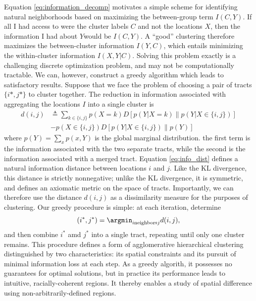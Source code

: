 	Equation \eqref{eq:information_decomp} motivates a simple scheme for identifying natural neighborhoods based on maximizing the between-group term $I(C,Y)$. If all I had access to were the cluster labels $C$ and not the locations $X$, then the information I had about $Y$would be $I(C,Y)$. A ``good'' clustering therefore maximizes the between-cluster information $I(Y,C)$, which entails minimizing the within-cluster information $I(X,Y|C)$. Solving this problem exactly is a challenging discrete optimization problem, and may not be computationally tractable. We can, however, construct a greedy algorithm which leads to satisfactory results. Suppose that we face the problem of choosing a pair of tracts $\{i*,j*\}$ to cluster together. The reduction in information associated with aggregating the locations $I$ into a single cluster is 
	\begin{align}
		d(i,j) &\triangleq  \sum_{k \in \{i,j\}} p(X = k)D[p(Y|X = k)\| p(Y|X \in \{i,j\})] \\
		&- p(X\in \{i,j\})D[p(Y|X\in \{i,j\}) \| p(Y)] \label{eq:info_dist}
	\end{align}
	where $p(Y) = \sum_{x} p(x,Y)$ is the global marginal distribution. the first term is the information associated with the two separate tracts, while the second is the information associated with a merged tract. Equation \eqref{eq:info_dist} defines a natural information distance between locations $i$ and $j$. Like the KL divergence, this distance is strictly nonnegative; unlike the KL divergence, it is symmetric, and defines an axiomatic metric on the space of tracts. Importantly, we can therefore use the distance $d(i,j)$ as a dissimilarity measure for the purposes of clustering. Our greedy procedure is simple: at each iteration, determine
	\begin{equation}
		(i^*,j^*) = \argmin_{i \text{neighbors} j} d(i,j),
	\end{equation}
	and then combine $i^*$ amd $j^*$ into a single tract, repeating until only one cluster remains. This procedure defines a form of agglomerative hierarchical clustering distinguished by two characteristics: its spatial constraints and its pursuit of minimal information loss at each step. As a greedy algorith, it possesses no guarantees for optimal solutions, but in practice its performance leads to intuitive, racially-coherent regions. It thereby enables a study of spatial difference using non-arbitrarily-defined regions. 






